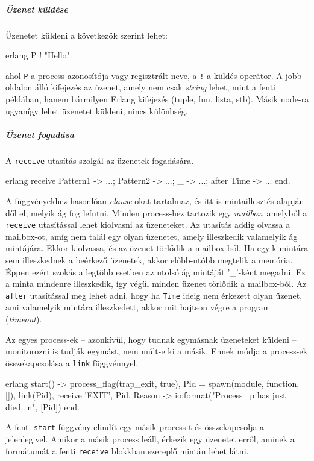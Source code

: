 \documentclass[12pt, a4paper, oneside]{book}
\begin{document}
\subparagraph{Üzenet küldése} Üzenetet küldeni a következők szerint lehet:
\begin{code}{erlang}{}
          P ! "Hello". 
\end{code} 
\noindent ahol \texttt{P} a process azonosítója vagy regisztrált
neve, a \texttt{!} a küldés operátor. A jobb oldalon álló kifejezés az üzenet,
amely nem csak \emph{string} lehet, mint a fenti példában, hanem bármilyen Erlang
kifejezés (tuple, fun, lista, stb). Másik node-ra ugyanígy lehet üzenetet
küldeni, nincs különbség.

\subparagraph{Üzenet fogadása} A \texttt{receive} utasítás szolgál az üzenetek
fogadására. 
\begin{code}{erlang}{}
receive
  Pattern1 ->
        ...;
  Pattern2 ->
        ...;
  _ ->
        ...;
after Time ->
        ...
end.
\end{code}

\noindent A függvényekhez hasonlóan \emph{clause}-okat tartalmaz, és itt is
mintaillesztés alapján dől el, melyik ág fog lefutni. Minden process-hez
tartozik egy \emph{mailbox}, amelyből a \texttt{receive} utasítással lehet kiolvasni az
üzeneteket. Az utasítás addig olvassa a mailbox-ot, amíg nem talál egy olyan
üzenetet, amely illeszkedik valamelyik ág mintájára. Ekkor kiolvassa, és az
üzenet törlődik a mailbox-ból. Ha egyik mintára sem illeszkednek a beérkező
üzenetek, akkor előbb-utóbb megtelik a memória. Éppen ezért szokás a legtöbb
esetben az utolsó ág mintáját '\_'-ként megadni. Ez a minta mindenre
illeszkedik, így végül minden üzenet törlődik a mailbox-ból. Az \texttt{after}
utasítással meg lehet adni, hogy ha \texttt{Time} ideig nem érkezett olyan
üzenet, ami valamelyik mintára illeszkedett, akkor mit hajtson végre a program
(\emph{timeout}).

Az egyes process-ek -- azonkívül, hogy tudnak egymásnak üzeneteket küldeni --
monitorozni is tudják egymást, nem múlt-e ki a másik. Ennek módja a process-ek
összekapcsolása a \texttt{link} függvénnyel. 

\begin{code}{erlang}{}
start() ->
  process_flag(trap_exit, true),
  Pid = spawn(module, function, []),
  link(Pid),
  receive
    {'EXIT', Pid, Reason} ->
      io:format("Process ~p has just died.~n", [Pid])
  end.
\end{code}

A fenti \texttt{start} függvény elindít egy másik process-t és összekapcsolja a
jelenlegivel. Amikor a másik process leáll, érkezik egy üzenetet erről, aminek a
formátumát a fenti \texttt{receive} blokkban szereplő mintán lehet látni. 
\end{document}
